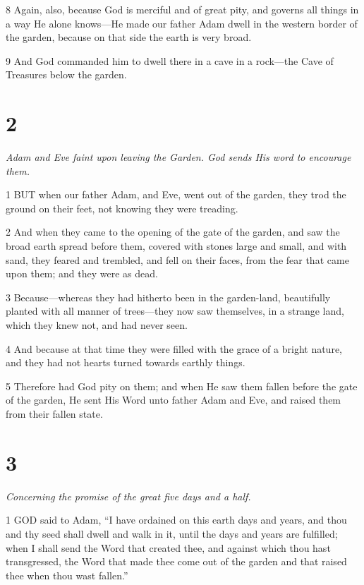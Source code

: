 \par 8 Again, also, because God is merciful and of great pity, and governs all things in a way He alone knows—He made our father Adam dwell in the western border of the garden, because on that side the earth is very broad.

\par 9 And God commanded him to dwell there in a cave in a rock—the Cave of Treasures below the garden.

\chapter{2}

\par \textit{Adam and Eve faint upon leaving the Garden. God sends His word to encourage them.}

\par 1 BUT when our father Adam, and Eve, went out of the garden, they trod the ground on their feet, not knowing they were treading.

\par 2 And when they came to the opening of the gate of the garden, and saw the broad earth spread before them, covered with stones large and small, and with sand, they feared and trembled, and fell on their faces, from the fear that came upon them; and they were as dead.

\par 3 Because—whereas they had hitherto been in the garden-land, beautifully planted with all manner of trees—they now saw themselves, in a strange land, which they knew not, and had never seen.

\par 4 And because at that time they were filled with the grace of a bright nature, and they had not hearts turned towards earthly things.

\par 5 Therefore had God pity on them; and when He saw them fallen before the gate of the garden, He sent His Word unto father Adam and Eve, and raised them from their fallen state.

\chapter{3}

\par \textit{Concerning the promise of the great five days and a half.}

\par 1 GOD said to Adam, “I have ordained on this earth days and years, and thou and thy seed shall dwell and walk in it, until the days and years are fulfilled; when I shall send the Word that created thee, and against which thou hast transgressed, the Word that made thee come out of the garden and that raised thee when thou wast fallen.”

